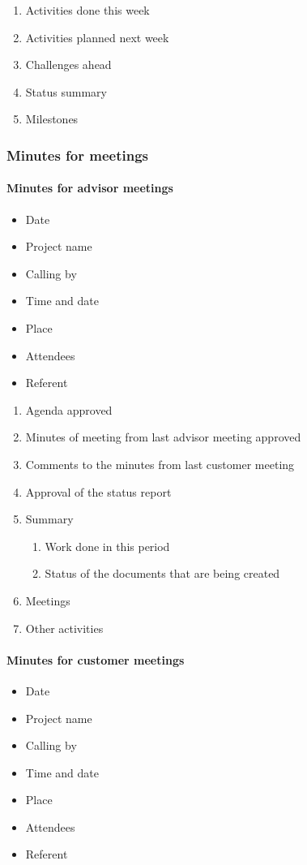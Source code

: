 \begin{enumerate}
\item{}Activities done this week
\item{}Activities planned next week
\item{}Challenges ahead
\item{}Status summary
\item{}Milestones
\end{enumerate}

\subsubsection{Minutes for meetings}

\paragraph{Minutes for advisor meetings} \hfill
\newline
\begin{itemize}
\item{}Date
\item{}Project name
\item{}Calling by
\item{}Time and date 
\item{}Place 
\item{}Attendees 
\item{}Referent
\end{itemize}

\begin{enumerate}
\item{}Agenda approved
\item{}Minutes of meeting from last advisor meeting approved 
\item{}Comments to the minutes from last customer meeting
\item{}Approval of the status report
\item{}Summary
\begin{enumerate}
\item{}Work done in this period
\item{}Status of the documents that are being created
\end{enumerate}
\item{}Meetings
\item{}Other activities
\end{enumerate}

\paragraph{Minutes for customer meetings} \hfill
\newline
\begin{itemize}
\item{}Date
\item{}Project name
\item{}Calling by
\item{}Time and date 
\item{}Place 
\item{}Attendees 
\item{}Referent
\end{itemize}

